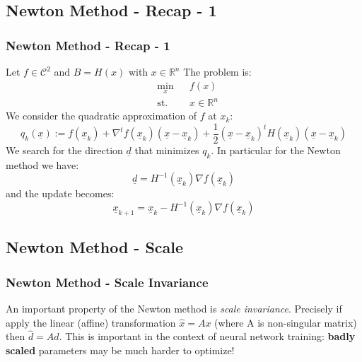\documentclass[professionalfont]{beamer}
\begin{document}
  \subsection{Newton Method - Recap - 1}
	\begin{frame}
  	 \frametitle{Newton Method - Recap - 1}
     Let $f \in \mathcal{C}^2$ and $B = H(x)$ with $x \in \mathbb{R}^n$\newline
     The problem is:
     \begin{equation*}
     \begin{aligned}
       & \underset{x}{\text{min}}
       & & f(x) \\
       & \text{st.}
       & & x \in \mathbb{R}^n
     \end{aligned}
     \end{equation*}
     We consider the quadratic approximation of $f$ at $x_k$:
     \begin{equation*}
       q_k(\underline{x}) := f(\underline{x}_k) + \nabla^{t}f(\underline{x}_k)(\underline{x} - \underline{x}_k) + \frac{1}{2}(\underline{x} - \underline{x}_k)^{t}H(\underline{x}_k)(\underline{x} - \underline{x}_k)
     \end{equation*}
     We search for the direction $\underline{d}$ that minimizes $q_k$.\newline
     In particular for the Newton method we have:
     \begin{equation*}
       \underline{d} = H^{-1}(\underline{x}_k)\nabla f{(\underline{x}_k)}
     \end{equation*}
     and the update becomes:
     \begin{equation*}
       \underline{x}_{k+1} = \underline{x}_{k} - H^{-1}(\underline{x}_k) \nabla f{(\underline{x}_k)}
     \end{equation*}
  \end{frame}

  \subsection{Newton Method - Scale}
	\begin{frame}
	 \frametitle{Newton Method - Scale Invariance}
   An important property of the Newton method is \textit{scale invariance}.
   Precisely if apply the linear (affine) transformation $\hat{x} = Ax$ (where A is non-singular matrix) then
   $\hat{d} = Ad$.\newline\newline
   This is important in the context of neural network training: \textbf{badly scaled} parameters may be much harder to optimize!\newline\newline
	\end{frame}
\end{document}
